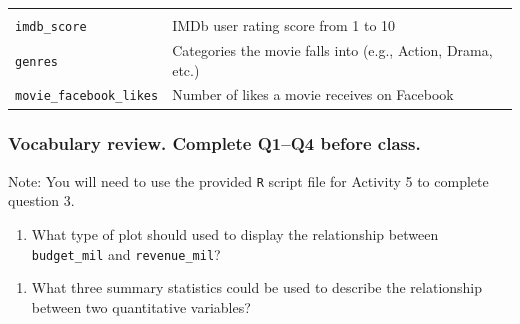 \documentclass[
]{report}
\providecommand{\tightlist}{%
  \setlength{\itemsep}{0pt}\setlength{\parskip}{0pt}}
\begin{document}
\begin{longtable}[]{@{}ll@{}}
\begin{minipage}[t]{0.72\columnwidth}
\end{minipage}\tabularnewline
\begin{minipage}[t]{0.22\columnwidth}\raggedright
\texttt{imdb\_score}\strut
\end{minipage} & \begin{minipage}[t]{0.72\columnwidth}\raggedright
IMDb user rating score from 1 to 10\strut
\end{minipage}\tabularnewline
\begin{minipage}[t]{0.22\columnwidth}\raggedright
\texttt{genres}\strut
\end{minipage} & \begin{minipage}[t]{0.72\columnwidth}\raggedright
Categories the movie falls into (e.g., Action, Drama, etc.)\strut
\end{minipage}\tabularnewline
\begin{minipage}[t]{0.22\columnwidth}\raggedright
\texttt{movie\_facebook\_likes}\strut
\end{minipage} & \begin{minipage}[t]{0.72\columnwidth}\raggedright
Number of likes a movie receives on Facebook\strut
\end{minipage}\tabularnewline
\bottomrule
\end{longtable}

\hypertarget{vocabulary-review.-complete-q1q4-before-class.}{%
\subsubsection*{Vocabulary review. Complete Q1--Q4 before class.}\label{vocabulary-review.-complete-q1q4-before-class.}}

Note: You will need to use the provided \texttt{R} script file for Activity 5 to complete question 3.

\begin{enumerate}
\def\labelenumi{\arabic{enumi}.}
\tightlist
\item
  What type of plot should used to display the relationship between \texttt{budget\_mil} and \texttt{revenue\_mil}?
\end{enumerate}

\vspace{0.2in}

\begin{enumerate}
\def\labelenumi{\arabic{enumi}.}
\setcounter{enumi}{1}
\tightlist
\item
  What three summary statistics could be used to describe the relationship between two quantitative variables?
\end{enumerate}
\end{document}

